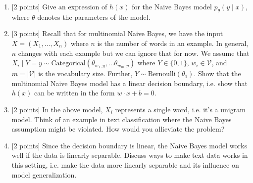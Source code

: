 \documentclass{article}
\theoremstyle{case}
\theoremstyle{definition}
\newcommand{\recall}[1]{\noindent{[\textbf{RECALL:} #1]}}
\begin{document}
\begin{enumerate}
    \item {[2 points]} Give an expression of $h(x)$ for the Naive Bayes model $p_\theta(y\mid x)$, where $\theta$ denotes the parameters of the model.

    \newpage
\item {[3 points]} Recall that for multinomial Naive Bayes,
        we have the input $X=(X_1, \ldots, X_n)$ where $n$ is the number of words in an example.
        In general, $n$ changes with each example but we can ignore that for now.
        We assume that $X_i\mid Y=y \sim \text{Categorical}(\theta_{w_1,y}, \ldots \theta_{w_m,y})$ where $Y\in \{0, 1\}$, $w_i\in\mathcal{V}$, and $m=|\mathcal{V}|$ is the vocabulary size.
        Further, $Y\sim\text{Bernoulli}(\theta_1)$.
        Show that the multinomial Naive Bayes model has a linear decision boundary,
        i.e. show that $h(x)$ can be written in the form $w\cdot x + b=0$.
        \recall{
            The categorical distribution is a multinomial distribution with one trial.
            Its PMF is
            $$
            p(x_1,\ldots, x_m) = \prod_{i=1}^m\theta_{i}^{x_i} \;,
            $$
            where $x_i = \mathbbm{1}[x=i]$, $\sum_{i=1}^m x_i = 1$,
            and $\sum_{i=1}^m \theta_i = 1$.
        }
    
    \newpage
\item {[2 points]} In the above model, $X_i$ represents a single word, i.e. it's a unigram model.
    Think of an example in text classification where the Naive Bayes assumption might be violated.
    How would you allieviate the problem?

\item {[2 points]} Since the decision boundary is linear, the Naive Bayes model works well if the data is linearly separable.
        Discuss ways to make text data works in this setting, i.e. make the data
        more linearly separable and its influence on model generalization.

\newpage
\end{enumerate}
\end{document}
